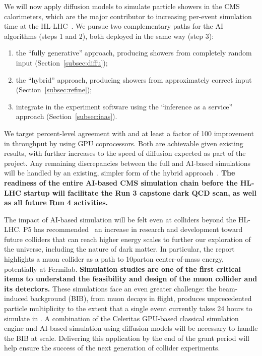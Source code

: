 We will now apply diffusion models to simulate particle showers in the CMS calorimeters, which are the major contributor to increasing per-event simulation time at the HL-LHC~\cite{Pedro:2020kbk}.
We pursue two complementary paths for the AI algorithms (steps 1 and 2), both deployed in the same way (step 3):
\begin{enumerate}
\item the ``fully generative'' approach, producing showers from completely random input (Section~\ref{subsec:diffu});
\item the ``hybrid'' approach, producing showers from approximately correct input (Section~\ref{subsec:refine});
\item integrate in the experiment software using the ``inference as a service'' approach (Section~\ref{subsec:iaas}).
\end{enumerate}
We target percent-level agreement with \GEANTfour and at least a factor of 100 improvement in throughput by using GPU coprocessors.
Both are achievable given existing results, with further increases to the speed of diffusion expected as part of the project.
Any remaining discrepancies between the full and AI-based simulations will be handled by an existing, simpler form of the hybrid approach~\cite{Bein:2023ylt}.
\textbf{The readiness of the entire AI-based CMS simulation chain before the HL-LHC startup will facilitate the Run 3 capstone dark QCD scan, as well as all future Run 4 activities.}

The impact of AI-based simulation will be felt even at colliders beyond the HL-LHC.
P5 has recommended~\cite{P5:2023} an increase in research and development toward future colliders that can reach higher energy scales
to further our exploration of the universe, including the nature of dark matter.
In particular, the report highlights a muon collider as a path to 10\TeV parton center-of-mass energy, potentially at Fermilab.
\textbf{Simulation studies are one of the first critical items to understand the feasibility and design of the muon collider and its detectors.}
These simulations face an even greater challenge: the beam-induced background (BIB), from muon decays in flight, produces unprecedented particle multiplicity
to the extent that a single event currently takes 24 hours to simulate in \GEANTfour.
A combination of the Celeritas GPU-based classical simulation engine and AI-based simulation using diffusion models will be necessary to handle the BIB at scale.
Delivering this application by the end of the grant period will help ensure the success of the next generation of collider experiments.

